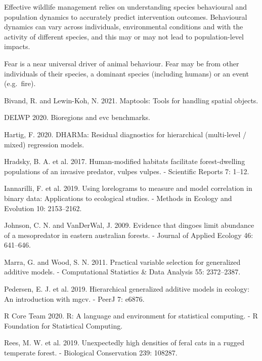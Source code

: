\documentclass[]{elsarticle} %
\begin{document}
Effective wildlife management relies on understanding species behavioural and population dynamics to accurately predict intervention outcomes. Behavioural dynamics can vary across individuals, environmental conditions and with the activity of different species, and this may or may not lead to population-level impacts.

Fear is a near universal driver of animal behaviour. Fear may be from other individuals of their species, a dominant species (including humans) or an event (e.g.~fire).

\hypertarget{refs}{}
\leavevmode\hypertarget{ref-maptools}{}%
Bivand, R. and Lewin-Koh, N. 2021. Maptools: Tools for handling spatial objects.

\leavevmode\hypertarget{ref-delwp2020}{}%
DELWP 2020. Bioregions and evc benchmarks.

\leavevmode\hypertarget{ref-DHARMa}{}%
Hartig, F. 2020. DHARMa: Residual diagnostics for hierarchical (multi-level / mixed) regression models.

\leavevmode\hypertarget{ref-hradsky2017human}{}%
Hradsky, B. A. et al. 2017. Human-modified habitats facilitate forest-dwelling populations of an invasive predator, vulpes vulpes. - Scientific Reports 7: 1--12.

\leavevmode\hypertarget{ref-https:ux2fux2fdoi.orgux2f10.1111ux2f2041-210X.13308}{}%
Iannarilli, F. et al. 2019. Using lorelograms to measure and model correlation in binary data: Applications to ecological studies. - Methods in Ecology and Evolution 10: 2153--2162.

\leavevmode\hypertarget{ref-https:ux2fux2fdoi.orgux2f10.1111ux2fj.1365-2664.2009.01650.x}{}%
Johnson, C. N. and VanDerWal, J. 2009. Evidence that dingoes limit abundance of a mesopredator in eastern australian forests. - Journal of Applied Ecology 46: 641--646.

\leavevmode\hypertarget{ref-MARRA20112372}{}%
Marra, G. and Wood, S. N. 2011. Practical variable selection for generalized additive models. - Computational Statistics \& Data Analysis 55: 2372--2387.

\leavevmode\hypertarget{ref-pedersen2019hierarchical}{}%
Pedersen, E. J. et al. 2019. Hierarchical generalized additive models in ecology: An introduction with mgcv. - PeerJ 7: e6876.

\leavevmode\hypertarget{ref-R}{}%
R Core Team 2020. R: A language and environment for statistical computing. - R Foundation for Statistical Computing.

\leavevmode\hypertarget{ref-REES2019108287}{}%
Rees, M. W. et al. 2019. Unexpectedly high densities of feral cats in a rugged temperate forest. - Biological Conservation 239: 108287.
\end{document}
